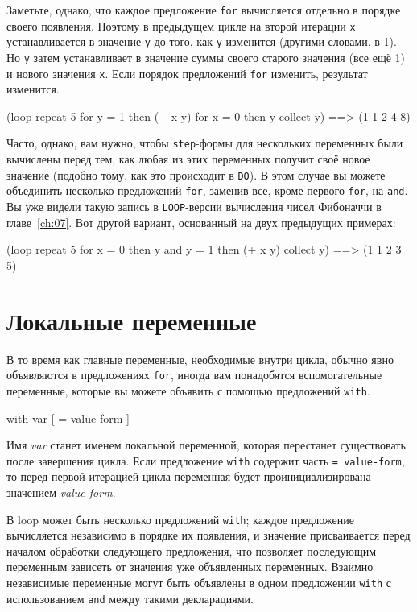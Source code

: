Заметьте, однако, что каждое предложение \lstinline{for} вычисляется отдельно в порядке своего
появления. Поэтому в предыдущем цикле на второй итерации \lstinline{x} устанавливается в
значение \lstinline{y} до того, как \lstinline{y} изменится (другими словами, в 1). Но \lstinline{y}
затем устанавливает в значение суммы своего старого значения (все ещё 1) и нового значения
\lstinline{x}. Если порядок предложений \lstinline{for} изменить, результат изменится.

\begin{myverb}
(loop repeat 5
      for y = 1 then (+ x y)
      for x = 0 then y
      collect y) ==> (1 1 2 4 8)
\end{myverb}

Часто, однако, вам нужно, чтобы \lstinline{step}-формы для нескольких переменных были вычислены перед
тем, как любая из этих переменных получит своё новое значение (подобно тому, как это
происходит в \lstinline{DO}). В этом случае вы можете объединить несколько предложений
\lstinline{for}, заменив все, кроме первого \lstinline{for}, на \lstinline{and}. Вы уже видели такую запись
в \lstinline{LOOP}-версии вычисления чисел Фибоначчи в главе~\ref{ch:07}. Вот другой вариант,
основанный на двух предыдущих примерах:

\begin{myverb}
(loop repeat 5 
      for x = 0 then y
      and y = 1 then (+ x y)
      collect y) ==> (1 1 2 3 5)
\end{myverb}

\section{Локальные переменные}

В то время как главные переменные, необходимые внутри цикла, обычно явно объявляются в
предложениях \lstinline{for}, иногда вам понадобятся вспомогательные переменные, которые вы
можете объявить с помощью предложений \lstinline{with}.

\begin{myverb}
with var [ = value-form ]
\end{myverb}

Имя \textit{var} станет именем локальной переменной, которая перестанет существовать после
завершения цикла. Если предложение \lstinline{with} содержит часть \lstinline{= value-form}, то
перед первой итерацией цикла переменная будет проинициализирована значением
\textit{value-form}.

В loop может быть несколько предложений \lstinline{with}; каждое предложение вычисляется
независимо в порядке их появления, и значение присваивается перед началом обработки
следующего предложения, что позволяет последующим переменным зависеть от значения уже
объявленных переменных. Взаимно независимые переменные могут быть объявлены в одном
предложении \lstinline{with} с использованием \lstinline{and} между такими дек\-ла\-ра\-ция\-ми.

